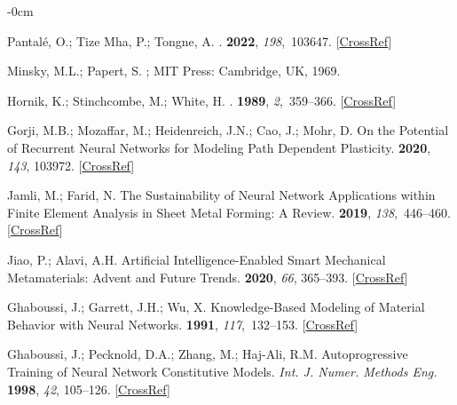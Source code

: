 \documentclass[algorithms,article,accept,pdftex,oneauthors]{Definitions/mdpi}
\begin{document}
\begin{adjustwidth}{-\extralength}{0cm}
\begin{thebibliography}{999}
Pantal{\'e}, O.; {Tize Mha}, P.; Tongne, A.
.
 {\bf 2022}, {\em
198},~103647. [\href{http://dx.doi.org/10.1016/j.finel.2021.103647}{CrossRef}]

Minsky, M.L.; Papert, S.
;
{MIT Press:} Cambridge, UK,
1969.

Hornik, K.; Stinchcombe, M.; White, H.
.
 {\bf 1989}, {\em 2},~359--366. [\href{http://dx.doi.org/10.1016/0893-6080(89)90020-8}{CrossRef}]

Gorji, M.B.; Mozaffar, M.; Heidenreich, J.N.; Cao, J.; Mohr, D.
\newblock On the Potential of Recurrent Neural Networks for Modeling Path
Dependent Plasticity.
 {\bf 2020}, {\em
143}, 103972. [\href{http://dx.doi.org/10.1016/j.jmps.2020.103972}{CrossRef}]

Jamli, M.; Farid, N.
\newblock The Sustainability of Neural Network Applications within Finite
Element Analysis in Sheet Metal Forming: {{A}} Review.
 {\bf 2019}, {\em 138},~446--460. [\href{http://dx.doi.org/10.1016/j.measurement.2019.02.034}{CrossRef}]

Jiao, P.; Alavi, A.H.
\newblock Artificial Intelligence-Enabled Smart Mechanical Metamaterials:
Advent and Future Trends.
 {\bf 2020}, \emph{66}, 365--393. [\href{http://dx.doi.org/10.1080/09506608.2020.1815394}{CrossRef}]

Ghaboussi, J.; Garrett, J.H.; Wu, X.
\newblock Knowledge-{{Based Modeling}} of {{Material Behavior}} with {{Neural
Networks}}.
 {\bf 1991}, {\em
117},~132--153. [\href{http://dx.doi.org/10.1061/(ASCE)0733-9399(1991)117:1(132)}{CrossRef}]

Ghaboussi, J.; Pecknold, D.A.; Zhang, M.; {Haj-Ali}, R.M.
\newblock Autoprogressive Training of Neural Network Constitutive Models. \emph{ Int. J. Numer. Methods Eng.} \textbf{1998}, \emph{42}, 105--126. [\href{http://dx.doi.org/10.1002/(SICI)1097-0207(19980515)42:1<105::AID-NME356>3.0.CO;2-V}{CrossRef}]


\end{thebibliography}
\end{adjustwidth}
\end{document}
